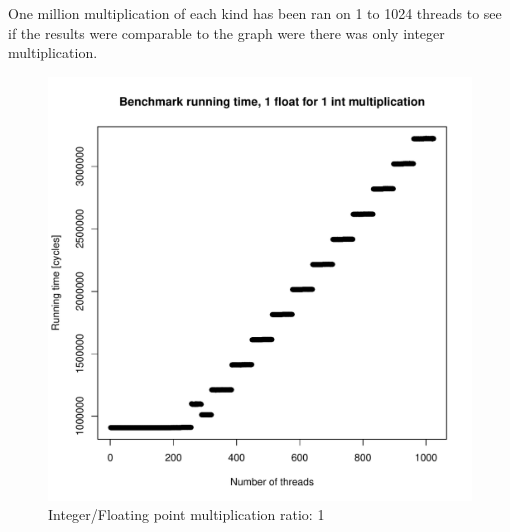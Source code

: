 \documentclass{article}
\begin{document}
	One million multiplication of each kind has been ran on 1 to 1024 threads to see if the results were comparable to the graph were there was only integer multiplication.
	\begin{figure}[h]
		\centering
		\vspace{-20pt}
    			\includegraphics[width=\linewidth]{"graphics/running_times_ratio11"}
		\vspace{-20pt}
		\caption{Integer/Floating point multiplication ratio: 1}
	\end{figure}
	\pagebreak
\end{document}
